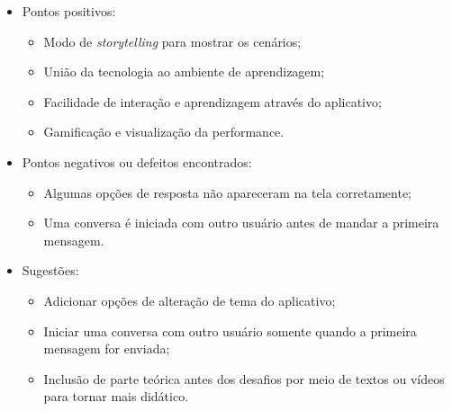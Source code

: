 \begin{itemize}
    \item Pontos positivos:
    \begin{itemize}
        \item Modo de \textit{storytelling} para mostrar os cenários;
        \item União da tecnologia ao ambiente de aprendizagem;
        \item Facilidade de interação e aprendizagem através do aplicativo;
        \item Gamificação e visualização da performance.
    \end{itemize}

    \item Pontos negativos ou defeitos encontrados:
    \begin{itemize}
        \item Algumas opções de resposta não apareceram na tela corretamente;
        \item Uma conversa é iniciada com outro usuário antes de mandar a primeira mensagem.
    \end{itemize}

    \item Sugestões:
    \begin{itemize}
        \item Adicionar opções de alteração de tema do aplicativo;
        \item Iniciar uma conversa com outro usuário somente quando a primeira mensagem for enviada;
        \item Inclusão de parte teórica antes dos desafios por meio de textos ou vídeos para tornar mais didático.
    \end{itemize}
\end{itemize}
